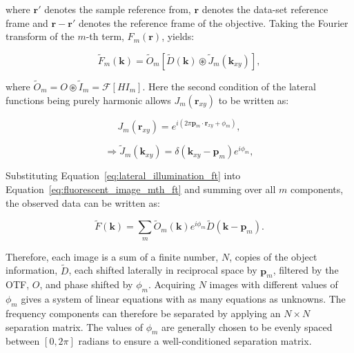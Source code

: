 where $\textbf{r}'$ denotes the sample reference from, $\textbf{r}$ denotes
the data-set reference frame and $\textbf{r} - \textbf{r}'$ denotes the 
reference frame of the objective. Taking the Fourier transform of the 
$m$-th term, $F_{m}(\textbf{r})$, yields:

\begin{equation}\label{eq:fluorescent_image_mth_ft}
\tilde{F}_{m}(\textbf{k}) = \tilde{O}_{m}\left[\tilde{D}(\textbf{k}) \circledast \tilde{J}_{m}(\textbf{k}_{xy})\right],
\end{equation}

where $\tilde{O}_{m} = O \circledast \tilde{I}_{m} = \mathcal{F}[HI_{m}]$.
Here the second condition of the lateral functions being purely harmonic allows
$J_{m}(\textbf{r}_{xy})$ to be written as:

\begin{equation}\label{eq:lateral_illumination}
J_{m}(\textbf{r}_{xy}) = e^{i\left(2\pi\textbf{p}_m\cdot\textbf{r}_{xy} + \phi_{m}\right)},
\end{equation}

\begin{equation}\label{eq:lateral_illumination_ft}
\Rightarrow \tilde{J}_{m}(\textbf{k}_{xy}) = \delta\left(\textbf{k}_{xy} - \textbf{p}_m\right)e^{i\phi_{m}},
\end{equation}

Substituting Equation~\ref{eq:lateral_illumination_ft} into 
Equation~\ref{eq:fluorescent_image_mth_ft} and summing over all $m$ components,
the observed data can be written as:

\begin{equation}\label{eq:single_SIM_image}
\tilde{F}(\textbf{k}) = \sum\limits_{m}{\tilde{O}_{m}(\textbf{k})e^{i\phi_{m}}\tilde{D}\left(\textbf{k} - \textbf{p}_m\right)}.
\end{equation}

Therefore, each image is a sum of a finite number, $N$, copies of the object 
information, $\tilde{D}$, each shifted laterally in reciprocal space by 
$\textbf{p}_{m}$, filtered by the OTF, $O$, and phase shifted by $\phi_{m}$.
Acquiring $N$ images with different values of $\phi_{m}$ gives a system of 
linear equations with as many equations as unknowns. The frequency components
can therefore be separated by applying an $N\times N$ separation matrix. The 
values of $\phi_{m}$ are generally chosen to be evenly spaced between 
$[0,2\pi]$ radians to ensure a well-conditioned separation 
matrix\cite{gustafsson2008three}.

